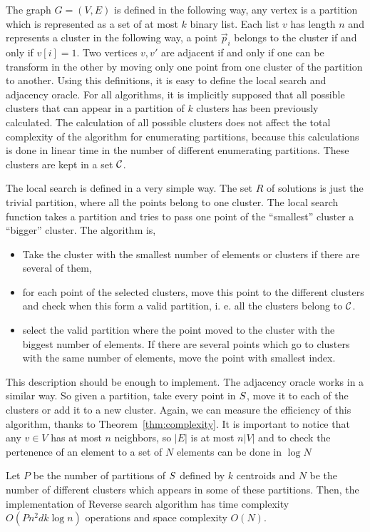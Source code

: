 \documentclass{article}
\begin{document}
The graph $G = (V,E)$ is defined in the following way, any vertex is a
partition which is represented as a set of at most $k$ binary list.
Each list $v$ has length $n$ and represents a cluster in the following
way, a point $\vec{p}_i$ belongs to the cluster if and only if $v[i] =
1$. Two vertices $v, v'$ are adjacent if and only if one can be
transform in the other by moving only one point from one cluster of
the partition to another. Using this definitions, it is easy to define
the local search and adjacency oracle. For all algorithms, it is
implicitly supposed that all possible clusters that can appear in a
partition of $k$ clusters has been previously calculated. The
calculation of all possible clusters does not affect the total
complexity of the algorithm for enumerating partitions, because this
calculations is done in linear time in the number of different
enumerating partitions. These clusters are kept in a set $\mathcal{C}$.


The local search is defined in a very simple way. The set $R$ of
solutions is just the trivial partition, where all the points belong
to one cluster. The local search function takes a partition and tries
to pass one point of the ``smallest'' cluster  a  ``bigger''
cluster. The algorithm is,
\begin{itemize}
\item Take the cluster with the smallest number of elements or
  clusters if there are several of them,
\item for each point of the selected clusters, move this point to the
  different clusters and check when this form a valid partition,
  i. e. all the clusters belong to $\mathcal{C}$.
\item select the valid partition where the point moved to the cluster
  with the biggest number of elements. If there are several points
  which go to clusters with the same number of elements, move the
  point with smallest index.
\end{itemize}
This description should be enough to implement. The adjacency oracle
works in a similar way. So given a partition, take every point in
$S$, move it to each of the clusters or add it to a new cluster.
Again, we can measure the efficiency of this algorithm, thanks to
Theorem~\ref{thm:complexity}. It is important to notice that any $v\in
V$ has at most $n$ neighbors, so $|E|$ is at most $n|V|$ and to check
the pertenence of an element to a set of $N$ elements can be done in
$\log N$
\begin{theorem}
  Let $P$  be the
  number of partitions of $S$ defined by $k$ centroids and $N$ be
  the number of different clusters which appears in some of these
  partitions. Then, the implementation of Reverse search algorithm has
  time complexity $O(P n^2 dk\log n)$ operations  and space complexity
  $O(N)$. 
\end{theorem}


\end{document}
